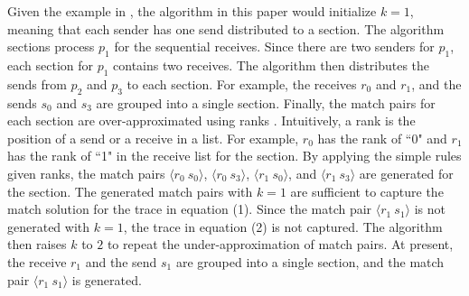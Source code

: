 Given the example in , the algorithm in this paper would initialize $k=1$, meaning that each sender has one send distributed to a section. The algorithm sections process $p_1$ for the sequential receives.
Since there are two senders for $p_1$, each section for $p_1$ contains two receives. 
The algorithm then distributes the sends from $p_2$ and $p_3$ to each section. For example, the receives $r_0$ and $r_1$, and the sends $s_0$ and $s_3$ are grouped into a single section. Finally, the match pairs for each section are over-approximated using ranks \cite{DBLP:conf/kbse/HuangMM13}. Intuitively, a rank is the position of a send or a receive in a list. For example, $r_0$ has the rank of ``0" and $r_1$ has the rank of ``1" in the receive list for the section. By applying the simple rules given ranks, the match pairs $\langle r_0\ s_0\rangle$, $\langle r_0\ s_3\rangle$, $\langle r_1\ s_0\rangle$, and $\langle r_1\ s_3\rangle$ are generated for the section.
The generated match pairs with $k=1$ are sufficient to capture the match solution for the trace in equation (1). 
Since the match pair $\langle r_1\ s_1\rangle$ is not generated with $k=1$, the trace in equation (2) is not captured. 
The algorithm then raises $k$ to $2$ to repeat the under-approximation of match pairs. At present, the receive $r_1$ and the send $s_1$ are grouped into a single section, and the match pair $\langle r_1\ s_1\rangle$ is generated.

